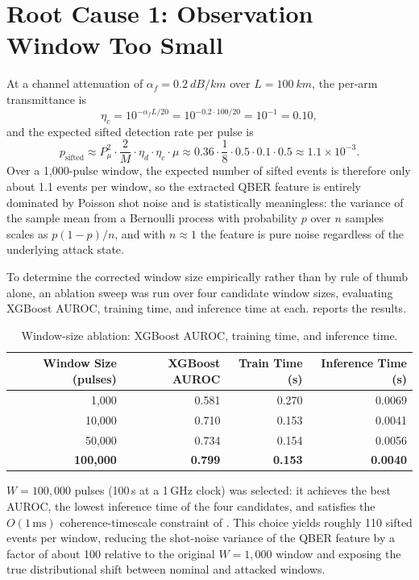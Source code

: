\documentclass[12pt, a4paper]{report}
\begin{document}
\section{Root Cause 1: Observation Window Too Small}\label{sec:failure_window}
At a channel attenuation of $\alpha_f = \SI{0.2}{dB/km}$ over $L = \SI{100}{km}$, the per-arm transmittance is
\begin{equation}
    \eta_c = 10^{-\alpha_f L / 20} = 10^{-0.2 \cdot 100 / 20} = 10^{-1} = 0.10,
\end{equation}
and the expected sifted detection rate per pulse is
\begin{equation}
    p_{\text{sifted}} \approx P_\mu^2 \cdot \frac{2}{M} \cdot \eta_d \cdot \eta_c \cdot \mu \approx 0.36 \cdot \frac{1}{8} \cdot 0.5 \cdot 0.1 \cdot 0.5 \approx 1.1 \times 10^{-3}.
\end{equation}
Over a 1{,}000-pulse window, the expected number of sifted events is therefore only about 1.1 events per window, so the extracted QBER feature is entirely dominated by Poisson shot noise and is statistically meaningless: the variance of the sample mean from a Bernoulli process with probability $p$ over $n$ samples scales as $p(1-p)/n$, and with $n \approx 1$ the feature is pure noise regardless of the underlying attack state.

To determine the corrected window size empirically rather than by rule of thumb alone, an ablation sweep was run over four candidate window sizes, evaluating XGBoost AUROC, training time, and inference time at each.  reports the results.

\begin{table}[h]
\centering
\caption{Window-size ablation: XGBoost AUROC, training time, and inference time.}
\label{tab:window_ablation}
\begin{tabular}{@{}rrrr@{}}
\toprule
\textbf{Window Size (pulses)} & \textbf{XGBoost AUROC} & \textbf{Train Time (s)} & \textbf{Inference Time (s)} \\
\midrule
1{,}000    & 0.581 & 0.270 & 0.0069 \\
10{,}000   & 0.710 & 0.153 & 0.0041 \\
50{,}000   & 0.734 & 0.154 & 0.0056 \\
\textbf{100{,}000}  & \textbf{0.799} & \textbf{0.153} & \textbf{0.0040} \\
\bottomrule
\end{tabular}
\end{table}

$W = 100{,}000$ pulses (100\,\textmu s at a 1\,GHz clock) was selected: it achieves the best AUROC, the lowest inference time of the four candidates, and satisfies the $O(1\,\text{ms})$ coherence-timescale constraint of . This choice yields roughly 110 sifted events per window, reducing the shot-noise variance of the QBER feature by a factor of about 100 relative to the original $W = 1{,}000$ window and exposing the true distributional shift between nominal and attacked windows.
\end{document}
